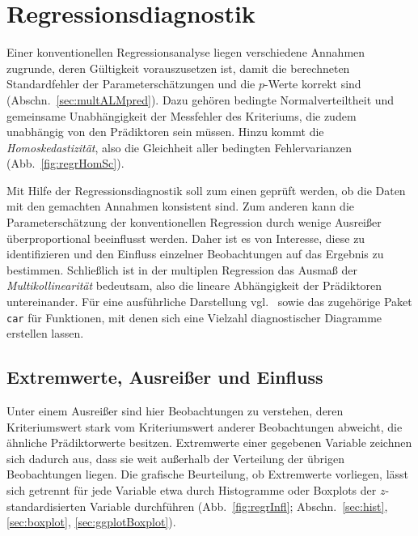 \section{Regressionsdiagnostik}
\label{sec:regrDiag}

Einer konventionellen Regressionsanalyse liegen verschiedene Annahmen zugrunde, deren Gültigkeit vorauszusetzen ist, damit die berechneten Standardfehler der Parameterschätzungen und die $p$-Werte korrekt sind (Abschn.\ \ref{sec:multALMpred}). Dazu gehören bedingte Normalverteiltheit und gemeinsame Unabhängigkeit der Messfehler des Kriteriums, die zudem unabhängig von den Prädiktoren sein müssen. Hinzu kommt die \emph{Homoskedastizität}, also die Gleichheit aller bedingten Fehlervarianzen (Abb.\ \ref{fig:regrHomSc}).

Mit Hilfe der Regressionsdiagnostik soll zum einen geprüft werden, ob die Daten mit den gemachten Annahmen konsistent sind. Zum anderen kann die Parameterschätzung der konventionellen Regression durch wenige Ausreißer überproportional beeinflusst werden. Daher ist es von Interesse, diese zu identifizieren und den Einfluss einzelner Beobachtungen auf das Ergebnis zu bestimmen. Schließlich ist in der multiplen Regression das Ausmaß der \emph{Multikollinearität} bedeutsam, also die lineare Abhängigkeit der Prädiktoren untereinander. Für eine ausführliche Darstellung vgl.\  sowie das zugehörige Paket \lstinline!car! für Funktionen, mit denen sich eine Vielzahl diagnostischer Diagramme erstellen lassen.

\subsection{Extremwerte, Ausreißer und Einfluss}
\label{sec:regrInfluence}

Unter einem Ausreißer sind hier Beobachtungen zu verstehen, deren Kriteriumswert stark vom Kriteriumswert anderer Beobachtungen abweicht, die ähnliche Prädiktorwerte besitzen. Extremwerte einer gegebenen Variable zeichnen sich dadurch aus, dass sie weit außerhalb der Verteilung der übrigen Beobachtungen liegen. Die grafische Beurteilung, ob Extremwerte vorliegen, lässt sich getrennt für jede Variable etwa durch Histogramme oder Boxplots der $z$-standardisierten Variable durchführen (Abb.\ \ref{fig:regrInfl}; Abschn.\ \ref{sec:hist}, \ref{sec:boxplot}, \ref{sec:ggplotBoxplot}).

